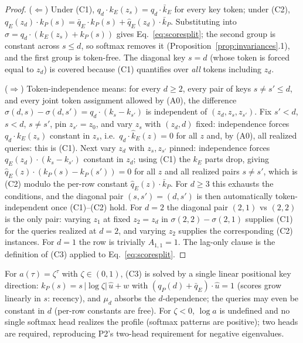 \documentclass{article}
\begin{document}
\begin{proof}
($\Leftarrow$) Under (C1), $q_d\cdot k_E(z_s) = q_d\cdot\bar k_E$ for every key token; under (C2), $q_E(z_d)\cdot k_P(s) = \bar q_E\cdot k_P(s) + \hat q_E(z_d)\cdot\bar k_P$. Substituting into $\sigma = q_d\cdot(k_E(z_s) + k_P(s))$ gives Eq.~\eqref{eq:scoresplit}; the second group is constant across $s \le d$, so softmax removes it (Proposition~\ref{prop:invariances}.1), and the first group is token-free. The diagonal key $s = d$ (whose token is forced equal to $z_d$) is covered because (C1) quantifies over \emph{all} tokens including $z_d$.

($\Rightarrow$) Token-independence means: for every $d \ge 2$, every pair of keys $s \ne s' \le d$, and every joint token assignment allowed by (A0), the difference $\sigma(d,s) - \sigma(d,s') = q_d\cdot(k_s - k_{s'})$ is independent of $(z_d, z_s, z_{s'})$. Fix $s' < d$, $s < d$, $s \ne s'$, pin $z_{s'} = z_0$, and vary $z_s$ with $(z_d, d)$ fixed: independence forces $q_d\cdot k_E(z_s)$ constant in $z_s$, i.e.\ $q_d\cdot\hat k_E(z) = 0$ for all $z$ and, by (A0), all realized queries: this is (C1). Next vary $z_d$ with $z_s, z_{s'}$ pinned: independence forces $q_E(z_d)\cdot(k_s - k_{s'})$ constant in $z_d$; using (C1) the $k_E$ parts drop, giving $\hat q_E(z)\cdot(k_P(s) - k_P(s')) = 0$ for all $z$ and all realized pairs $s \ne s'$, which is (C2) modulo the per-row constant $\hat q_E(z)\cdot\bar k_P$. For $d \ge 3$ this exhausts the conditions, and the diagonal pair $(s, s') = (d, s')$ is then automatically token-independent once (C1)--(C2) hold. For $d = 2$ the diagonal pair $(2,1)$ vs $(2,2)$ is the only pair: varying $z_1$ at fixed $z_2 = z_d$ in $\sigma(2,2) - \sigma(2,1)$ supplies (C1) for the queries realized at $d = 2$, and varying $z_2$ supplies the corresponding (C2) instances. For $d = 1$ the row is trivially $A_{1,1} = 1$. The lag-only clause is the definition of (C3) applied to Eq.~\eqref{eq:scoresplit}.
\end{proof}

\begin{remark}\label{rem:realizability}
For $a(\tau) = \zeta^\tau$ with $\zeta \in (0,1)$, (C3) is solved by a single linear positional key direction: $k_P(s) = s\,|\log\zeta|\,\hat u + w$ with $(q_P(d) + \bar q_E)\cdot\hat u = 1$ (scores grow linearly in $s$: recency), and $\mu_d$ absorbs the $d$-dependence; the queries may even be constant in $d$ (per-row constants are free). For $\zeta < 0$, $\log a$ is undefined and no single softmax head realizes the profile (softmax patterns are positive); two heads are required, reproducing P2's two-head requirement for negative eigenvalues.
\end{remark}
\end{document}
